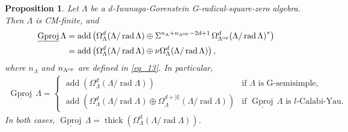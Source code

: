 \documentclass[12pt]{amsart}
\numberwithin{equation}{subsection}
\theoremstyle{plain}
\newtheorem{proposition}[theorem]{Proposition}
\theoremstyle{definition}
\newcommand{\rad}{\operatorname{rad}}
\newcommand{\add}{\operatorname{add}}
\newcommand{\sGproj}{\underline{\operatorname{Gproj}}\,}
\newcommand{\thick}{\operatorname{thick}}
\renewcommand{\L}{\Lambda}
\newcommand{\op}{{\rm op}}
\begin{document}
\begin{proposition}\label{claim_20}
Let $\L$ be a $d$-Iwanaga-Gorenstein G-radical-square-zero algebra.
Then $\L$ is CM-finite, and 
\begin{align}
    \textstyle 
    \sGproj\L 
    &=\add\left(\Omega_\L^{d}(\L/\rad\L) \oplus \Sigma^{n_{\L}+n_{\L^\op}-2d+1}\hspace{1.5pt}\Omega_{\L^\op}^{d}\!\left(\L/\rad\L\right)^*\right)\\[1pt]
    &= \add\left(\Omega_\L^{d}(\L/\rad\L) \oplus \nu \Omega_\L^{d}(\L/\rad\L)\right),
\end{align}
where $n_{\L}$ and $n_{\L^\op}$ are defined in \eqref{eq_13}.
In particular,
\begin{align}
    \textstyle 
    \sGproj\L =     
    \begin{cases}
    \add(\Omega_\L^{d}(\L/\rad\L)) & \text{if $\L$ is G-semisimple,}\\[1pt]
    \add\left(\Omega_\L^{d}(\L/\rad\L) \oplus \Omega_\L^{d+|l|}(\L/\rad\L)\right) & \text{if $\sGproj\L$ is $l$-Calabi-Yau.}
    \end{cases}
\end{align}
In both cases, $\sGproj\L = \thick(\Omega_\L^{d}(\L/\rad\L))$.
\end{proposition} 
\end{document}
